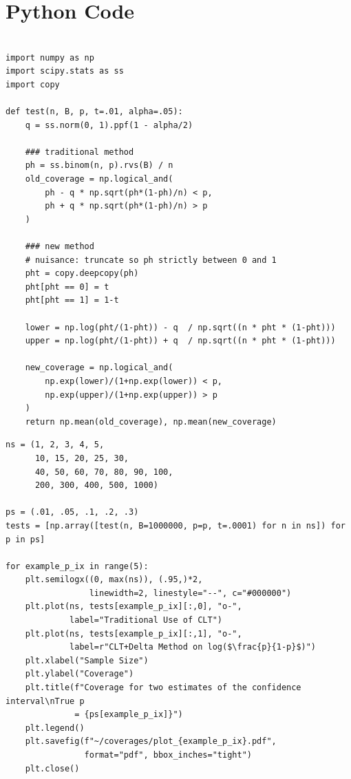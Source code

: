 \documentclass{article}
\begin{document}
\section*{Python Code}
\begin{verbatim}

import numpy as np
import scipy.stats as ss
import copy

def test(n, B, p, t=.01, alpha=.05):
    q = ss.norm(0, 1).ppf(1 - alpha/2)

    ### traditional method
    ph = ss.binom(n, p).rvs(B) / n
    old_coverage = np.logical_and(
        ph - q * np.sqrt(ph*(1-ph)/n) < p,
        ph + q * np.sqrt(ph*(1-ph)/n) > p
    )

    ### new method
    # nuisance: truncate so ph strictly between 0 and 1
    pht = copy.deepcopy(ph)
    pht[pht == 0] = t
    pht[pht == 1] = 1-t
    
    lower = np.log(pht/(1-pht)) - q  / np.sqrt((n * pht * (1-pht)))
    upper = np.log(pht/(1-pht)) + q  / np.sqrt((n * pht * (1-pht)))

    new_coverage = np.logical_and(
        np.exp(lower)/(1+np.exp(lower)) < p,
        np.exp(upper)/(1+np.exp(upper)) > p
    )
    return np.mean(old_coverage), np.mean(new_coverage)

\end{verbatim}
\newpage
\begin{verbatim}
ns = (1, 2, 3, 4, 5,
      10, 15, 20, 25, 30,
      40, 50, 60, 70, 80, 90, 100,
      200, 300, 400, 500, 1000)

ps = (.01, .05, .1, .2, .3)
tests = [np.array([test(n, B=1000000, p=p, t=.0001) for n in ns]) for p in ps]

for example_p_ix in range(5):
    plt.semilogx((0, max(ns)), (.95,)*2,
                 linewidth=2, linestyle="--", c="#000000")
    plt.plot(ns, tests[example_p_ix][:,0], "o-",
             label="Traditional Use of CLT")
    plt.plot(ns, tests[example_p_ix][:,1], "o-",
             label=r"CLT+Delta Method on log($\frac{p}{1-p}$)")
    plt.xlabel("Sample Size")
    plt.ylabel("Coverage")
    plt.title(f"Coverage for two estimates of the confidence interval\nTrue p
              = {ps[example_p_ix]}")
    plt.legend()
    plt.savefig(f"~/coverages/plot_{example_p_ix}.pdf",
                format="pdf", bbox_inches="tight")
    plt.close()
\end{verbatim}
\end{document}
